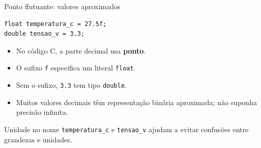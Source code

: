 \begin{frame}[fragile]{Ponto flutuante: valores aproximados}
\begin{lstlisting}
float temperatura_c = 27.5f;
double tensao_v = 3.3;
\end{lstlisting}
\begin{itemize}
\item No código C, a parte decimal usa \textbf{ponto}.
\item O sufixo \texttt{f} especifica um literal \texttt{float}.
\item Sem o sufixo, \texttt{3.3} tem tipo \texttt{double}.
\item Muitos valores decimais têm representação binária aproximada; não suponha precisão infinita.
\end{itemize}
\begin{block}{Unidade no nome}
\texttt{temperatura\_c} e \texttt{tensao\_v} ajudam a evitar confusões entre grandezas e unidades.
\end{block}
\end{frame}

